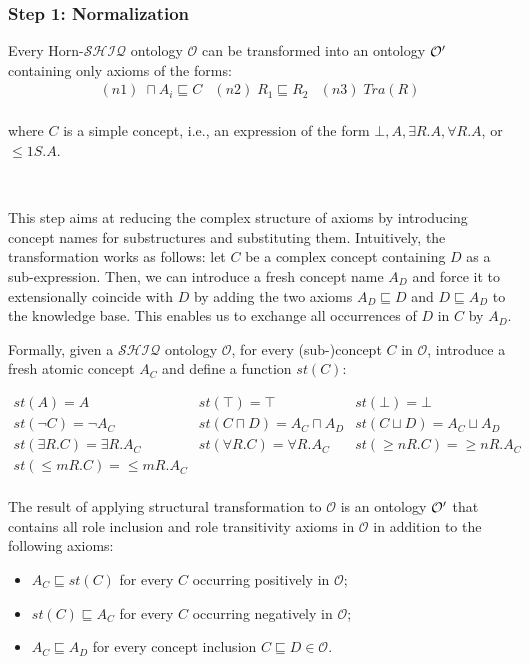 \documentclass[oneside]{book}
\newcommand{\shiq}{$\mathcal{SHIQ}$\xspace}
\newcommand{\hshiq}{Horn-\shiq\xspace}
\newcommand{\Onto}{\mathcal{O}}
\newcommand{\dlisa}{\sqsubseteq}
\newcommand{\dland}{\sqcap}
\newcommand{\dlor}{\sqcup}
\begin{document}
\subsubsection{Step 1: Normalization}

Every \hshiq ontology $\Onto$ can be transformed into an ontology $\cal O'$ containing only axioms of the forms: 
%
\[
\begin{array}{lll}
(n1) \; \dland A_i \dlisa C & (n2) \; R_1 \dlisa R_2 & (n3) \; Tra(R) \\
\end{array}
\]

where $C$ is a simple concept, i.e., an expression of the form $\bot, A, \exists R.A, \forall R.A$, or $\leq1S.A$. 

\

This step aims at reducing the complex structure of axioms by introducing concept names for substructures and substituting them. 
Intuitively, the transformation works as follows:
let $C$ be a complex concept containing $D$ as a sub-expression. Then, we can introduce a fresh concept name $A_D$ and force it to extensionally coincide with $D$ by adding
the two axioms $A_D \dlisa D$ and $D \dlisa A_D$ to the knowledge base. This enables
us to exchange all occurrences of $D$ in $C$ by $A_D$.

Formally, given a \shiq ontology $\Onto$, for every (sub-)concept $C$ in $\Onto$, introduce a fresh atomic concept $A_C$ and define a function $st(C)$: 

\[
\begin{array}{lllll}
st(A) = A & 
st(\top) = \top &
st(\bot) = \bot \\
st(\neg C) = \neg A_C &
st(C \dland D) = A_C \dland A_D &
st(C \dlor D) = A_C \dlor A_D \\ 
st(\exists R.C) = \exists R.A_C &
st(\forall R.C) = \forall R.A_C & 
st(\geq nR.C) = \geq nR.A_C \\
st(\leq mR.C) = \leq mR.A_C \\
\end{array}
\]


The result of applying structural transformation to $\Onto$ is an ontology $\cal O'$ that contains all role inclusion and role transitivity axioms in $\Onto$ in addition to the following axioms:

\begin{itemize}
	\item $A_C \dlisa st(C)$ for every $C$ occurring positively in $\Onto$;
	
	\item $st(C) \dlisa A_C$ for every $C$ occurring negatively in $\Onto$;
	
	\item $A_C \dlisa A_D$ for every concept inclusion $C \dlisa D \in \Onto$.
\end{itemize} 
\end{document}

